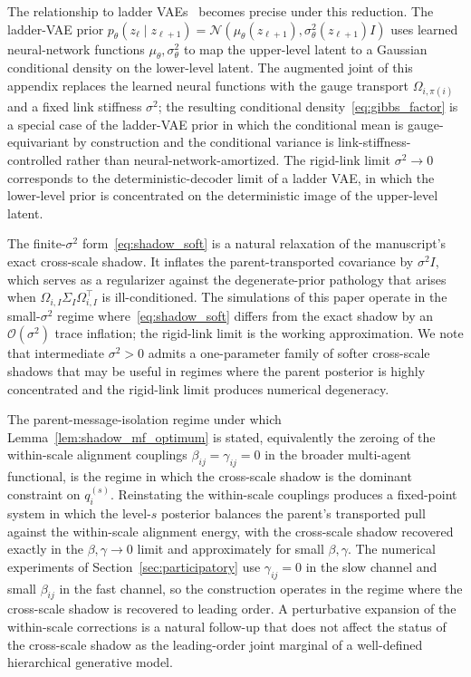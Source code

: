 \documentclass[11pt]{article}
\begin{document}
The relationship to ladder VAEs~\cite{Sonderby2016} becomes precise under this reduction. The ladder-VAE prior $p_\theta(z_\ell \mid z_{\ell+1}) = \mathcal{N}(\mu_\theta(z_{\ell+1}), \sigma^2_\theta(z_{\ell+1}) I)$ uses learned neural-network functions $\mu_\theta, \sigma^2_\theta$ to map the upper-level latent to a Gaussian conditional density on the lower-level latent. The augmented joint of this appendix replaces the learned neural functions with the gauge transport $\Omega_{i,\pi(i)}$ and a fixed link stiffness $\sigma^2$; the resulting conditional density~\eqref{eq:gibbs_factor} is a special case of the ladder-VAE prior in which the conditional mean is gauge-equivariant by construction and the conditional variance is link-stiffness-controlled rather than neural-network-amortized. The rigid-link limit $\sigma^2 \to 0$ corresponds to the deterministic-decoder limit of a ladder VAE, in which the lower-level prior is concentrated on the deterministic image of the upper-level latent.

The finite-$\sigma^2$ form~\eqref{eq:shadow_soft} is a natural relaxation of the manuscript's exact cross-scale shadow. It inflates the parent-transported covariance by $\sigma^2 I$, which serves as a regularizer against the degenerate-prior pathology that arises when $\Omega_{i,I}\Sigma_I\Omega_{i,I}^\top$ is ill-conditioned. The simulations of this paper operate in the small-$\sigma^2$ regime where~\eqref{eq:shadow_soft} differs from the exact shadow by an $\mathcal{O}(\sigma^2)$ trace inflation; the rigid-link limit is the working approximation. We note that intermediate $\sigma^2 > 0$ admits a one-parameter family of softer cross-scale shadows that may be useful in regimes where the parent posterior is highly concentrated and the rigid-link limit produces numerical degeneracy.

The parent-message-isolation regime under which Lemma~\ref{lem:shadow_mf_optimum} is stated, equivalently the zeroing of the within-scale alignment couplings $\beta_{ij} = \gamma_{ij} = 0$ in the broader multi-agent functional, is the regime in which the cross-scale shadow is the dominant constraint on $q_i^{(s)}$. Reinstating the within-scale couplings produces a fixed-point system in which the level-$s$ posterior balances the parent's transported pull against the within-scale alignment energy, with the cross-scale shadow recovered exactly in the $\beta, \gamma \to 0$ limit and approximately for small $\beta, \gamma$. The numerical experiments of Section~\ref{sec:participatory} use $\gamma_{ij} = 0$ in the slow channel and small $\beta_{ij}$ in the fast channel, so the construction operates in the regime where the cross-scale shadow is recovered to leading order. A perturbative expansion of the within-scale corrections is a natural follow-up that does not affect the status of the cross-scale shadow as the leading-order joint marginal of a well-defined hierarchical generative model.
\end{document}
